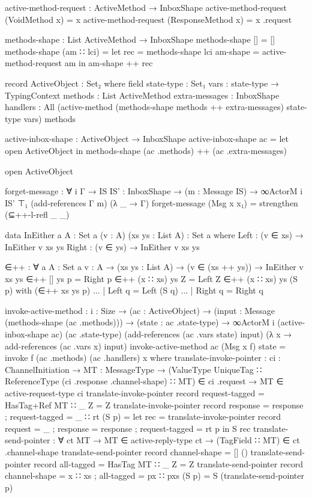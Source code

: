 \begin{code}
active-method-request : ActiveMethod → InboxShape
active-method-request (VoidMethod x) = x
active-method-request (ResponseMethod x) = x .request

methods-shape : List ActiveMethod → InboxShape
methods-shape [] = []
methods-shape (am ∷ lci) =
  let rec = methods-shape lci
      am-shape = active-method-request am
  in am-shape ++ rec

record ActiveObject : Set₂ where
  field
    state-type : Set₁
    vars : state-type → TypingContext
    methods : List ActiveMethod
    extra-messages : InboxShape
    handlers : All (active-method (methods-shape methods ++ extra-messages) state-type vars) methods

active-inbox-shape : ActiveObject → InboxShape
active-inbox-shape ac =
  let open ActiveObject
  in methods-shape (ac .methods) ++ (ac .extra-messages)

open ActiveObject

forget-message : ∀ {i Γ} →
                 {IS IS' : InboxShape} →
                 (m : Message IS) →
                 ∞ActorM i IS' ⊤₁ (add-references Γ m) (λ _ → Γ)
forget-message (Msg x x₁) = strengthen (⊆++-l-refl _ _)

data InEither {a} {A : Set a} (v : A) (xs ys : List A) : Set a where
  Left : (v ∈ xs) → InEither v xs ys
  Right : (v ∈ ys) → InEither v xs ys

∈++ : ∀ {a} {A : Set a} {v : A} → (xs ys : List A) → (v ∈ (xs ++ ys)) → InEither v xs ys
∈++ [] ys p = Right p
∈++ (x ∷ xs) ys Z = Left Z
∈++ (x ∷ xs) ys (S p) with (∈++ xs ys p)
... | Left q = Left (S q)
... | Right q = Right q

invoke-active-method : {i : Size} →
                       (ac : ActiveObject) →
                       (input : Message (methods-shape (ac .methods))) →
                       (state : ac .state-type) →
                       ∞ActorM i (active-inbox-shape ac)
                         (ac .state-type) (add-references (ac .vars state) input) (λ x → add-references (ac .vars x) input)
invoke-active-method ac (Msg x f) state = invoke f (ac .methods) (ac .handlers) x
  where
    translate-invoke-pointer : {ci : ChannelInitiation} →
                               {MT : MessageType} →
                               (ValueType UniqueTag ∷ ReferenceType (ci .response .channel-shape) ∷ MT) ∈ ci .request →
                               MT ∈ active-request-type ci
    translate-invoke-pointer {record { request-tagged = HasTag+Ref MT ∷ _ }} Z = Z
    translate-invoke-pointer {record { response = response ; request-tagged = _ ∷ rt }} (S p) =
      let rec = translate-invoke-pointer {record { request = _ ; response = response ; request-tagged = rt }} p
      in S rec
    translate-send-pointer : ∀ {ct MT} →
                               MT ∈ active-reply-type ct →
                               (TagField ∷ MT) ∈ ct .channel-shape
    translate-send-pointer {record { channel-shape = [] }} ()
    translate-send-pointer {record { all-tagged = HasTag MT ∷ _ }} Z = Z
    translate-send-pointer {record { channel-shape = x ∷ xs ; all-tagged = px ∷ pxs }} (S p) = S (translate-send-pointer p)


\end{code}
